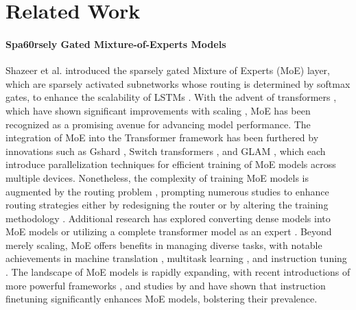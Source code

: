\section{Related Work}
\vspace{-1mm}
\paragraph{Spa60rsely Gated Mixture-of-Experts Models} Shazeer et al. \cite{shazeer2017outrageously} introduced the sparsely gated Mixture of Experts (MoE) layer, which are sparsely activated subnetworks whose routing is determined by softmax gates, to enhance the scalability of LSTMs \cite{Hochreiter1997LongSM}. With the advent of transformers \cite{Vaswani2017AttentionIA, Radford2018ImprovingLU, Devlin2019BERTPO}, which have shown significant improvements with scaling \cite{kaplan2020scaling}, MoE has been recognized as a promising avenue for advancing model performance. The integration of MoE into the Transformer framework has been furthered by innovations such as Gshard \cite{Lepikhin2020GShardSG}, Switch transformers \cite{fedus2022switch}, and GLAM \cite{Du2021GLaMES}, which each introduce parallelization techniques for efficient training of MoE models across multiple devices. Nonetheless, the complexity of training MoE models is augmented by the routing problem \cite{Rosenbaum2019RoutingNA, Mittal2022IsAM}, prompting numerous studies to enhance routing strategies either by redesigning the router \cite{Roller2021HashLF, Lewis2021BASELS, Chi2022OnTR, Zhou2022MixtureofExpertsWE} or by altering the training methodology \cite{Zoph2022STMoEDS, Dai2022StableMoESR, Shen2023ModuleFormerLM}. Additional research has explored converting dense models into MoE models \cite{Komatsuzaki2022SparseUT, Zhang2021MoEficationTF} or utilizing a complete transformer model as an expert \cite{Li2022BranchTrainMergeEP}. Beyond merely scaling, MoE offers benefits in managing diverse tasks, with notable achievements in machine translation \cite{Kudugunta2021BeyondDT}, multitask learning \cite{Hazimeh2021DSelectkDS, Gupta2022SparselyAM}, and instruction tuning \cite{Shen2023MixtureofExpertsMI}. The landscape of MoE models is rapidly expanding, with recent introductions of more powerful frameworks \cite{jiang2024mixtral, dai2024deepseekmoe}, and studies by \cite{shen2023mixture} and \cite{qiu2023emergent} have shown that instruction finetuning significantly enhances MoE models, bolstering their prevalence.

